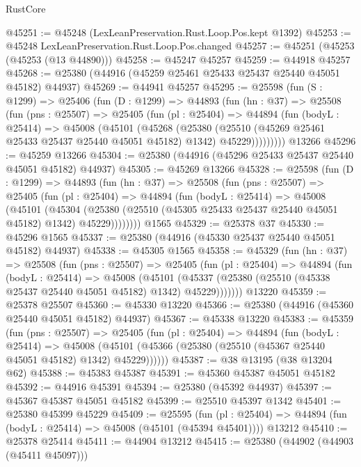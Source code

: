 \begin{lexlean}{RustCore}
\begin{coremodule}
@45251 := @45248 (LexLeanPreservation.Rust.Loop.Pos.kept @1392)
@45253 := @45248 LexLeanPreservation.Rust.Loop.Pos.changed
@45257 := @45251 (@45253 (@45253 (@13 @44890)))
@45258 := @45247 @45257
@45259 := @44918 @45257
@45268 := @25380 (@44916 (@45259 @25461 @25433 @25437 @25440 @45051 @45182) @44937)
@45269 := @44941 @45257
@45295 := @25598
    (fun (S : @1299) =>
    @25406
      (fun (D : @1299) =>
      @44893
        (fun (hn : @37) =>
        @25508
          (fun (pns : @25507) =>
          @25405
            (fun (pl : @25404) =>
            @44894
              (fun (bodyL : @25414) =>
              @45008
                (@45101
                  (@45268
                    (@25380
                      (@25510 (@45269 @25461 @25433 @25437 @25440 @45051 @45182) @1342)
                      @45229)))))))))
    @13266
@45296 := @45259 @13266
@45304 := @25380 (@44916 (@45296 @25433 @25437 @25440 @45051 @45182) @44937)
@45305 := @45269 @13266
@45328 := @25598
    (fun (D : @1299) =>
    @44893
      (fun (hn : @37) =>
      @25508
        (fun (pns : @25507) =>
        @25405
          (fun (pl : @25404) =>
          @44894
            (fun (bodyL : @25414) =>
            @45008
              (@45101
                (@45304
                  (@25380 (@25510 (@45305 @25433 @25437 @25440 @45051 @45182) @1342) @45229))))))))
    @1565
@45329 := @25378 @37
@45330 := @45296 @1565
@45337 := @25380 (@44916 (@45330 @25437 @25440 @45051 @45182) @44937)
@45338 := @45305 @1565
@45358 := @45329
    (fun (hn : @37) =>
    @25508
      (fun (pns : @25507) =>
      @25405
        (fun (pl : @25404) =>
        @44894
          (fun (bodyL : @25414) =>
          @45008
            (@45101
              (@45337 (@25380 (@25510 (@45338 @25437 @25440 @45051 @45182) @1342) @45229)))))))
    @13220
@45359 := @25378 @25507
@45360 := @45330 @13220
@45366 := @25380 (@44916 (@45360 @25440 @45051 @45182) @44937)
@45367 := @45338 @13220
@45383 := @45359
    (fun (pns : @25507) =>
    @25405
      (fun (pl : @25404) =>
      @44894
        (fun (bodyL : @25414) =>
        @45008 (@45101 (@45366 (@25380 (@25510 (@45367 @25440 @45051 @45182) @1342) @45229))))))
@45387 := @38 @13195 (@38 @13204 @62)
@45388 := @45383 @45387
@45391 := @45360 @45387 @45051 @45182
@45392 := @44916 @45391
@45394 := @25380 (@45392 @44937)
@45397 := @45367 @45387 @45051 @45182
@45399 := @25510 @45397 @1342
@45401 := @25380 @45399 @45229
@45409 := @25595
    (fun (pl : @25404) => @44894 (fun (bodyL : @25414) => @45008 (@45101 (@45394 @45401))))
    @13212
@45410 := @25378 @25414
@45411 := @44904 @13212
@45415 := @25380 (@44902 (@44903 (@45411 @45097)))

\end{coremodule}
\end{lexlean}
